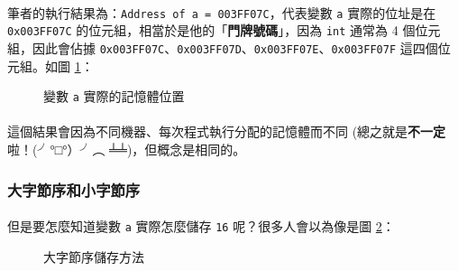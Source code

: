 \documentclass[12pt,a4paper,oneside]{report}
\begin{document}
\begin{CJK}{UTF8}{bkai}
\paragraph{}筆者的執行結果為：\lstinline!Address of a = 003FF07C!，代表變數 \lstinline!a! 實際的位址是在 \lstinline!0x003FF07C! 的位元組，相當於是他的「\textbf{門牌號碼}」，因為 \lstinline!int! 通常為 4 個位元組，因此會佔據 \lstinline!0x003FF07C!、\lstinline!0x003FF07D!、\lstinline!0x003FF07E!、\lstinline!0x003FF07F! 這四個位元組。如圖 \ref{program:struct:fig:int:address}：

\begin{figure}[h!]
\centering
{}
\caption{變數 \lstinline!a! 實際的記憶體位置}
\label{program:struct:fig:int:address}
\end{figure}

\paragraph{}這個結果會因為不同機器、每次程式執行分配的記憶體而不同 (總之就是\textbf{不一定}啦！(╯°□°）╯︵ ╧╧)，但概念是相同的。

\subsubsection{大字節序和小字節序}

\paragraph{}但是要怎麼知道變數 \lstinline!a! 實際怎麼儲存 \lstinline!16! 呢？很多人會以為像是圖 \ref{program:struct:fig:big:endian:16}：

\begin{figure}[h!]
\centering
{}
\caption{大字節序儲存方法}
\label{program:struct:fig:big:endian:16}
\end{figure}


\end{CJK}
\end{document}
